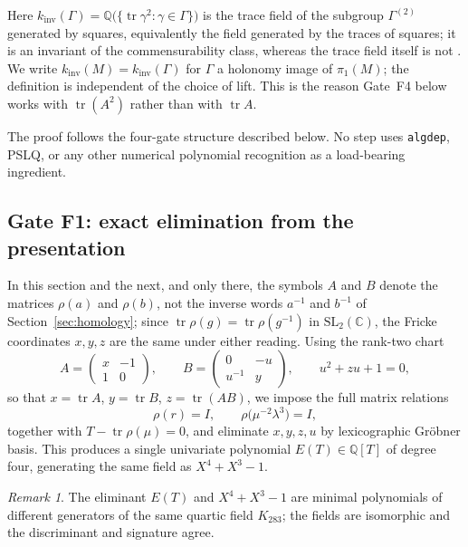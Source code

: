 \documentclass[11pt,a4paper]{article}
\theoremstyle{definition}
\theoremstyle{remark}
\newtheorem{remark}[theorem]{Remark}
\newcommand{\tr}{\operatorname{tr}}
\newcommand{\kinv}{k_{\mathrm{inv}}}
\newcommand{\SLtwo}{\mathrm{SL}_2(\mathbb{C})}
\newcommand{\Q}{\mathbb{Q}}
\begin{document}
Here $\kinv(\Gamma) = \Q\bigl(\{\tr\gamma^2 : \gamma \in \Gamma\}\bigr)$
is the trace field of the subgroup $\Gamma^{(2)}$ generated by squares,
equivalently the field generated by the traces of squares; it is an
invariant of the commensurability class, whereas the trace field itself
is not \cite[Ch.~3]{MR}. We write $\kinv(M) = \kinv(\Gamma)$ for
$\Gamma$ a holonomy image of $\pi_1(M)$; the definition is independent
of the choice of lift. This is the reason Gate~F4 below works with
$\tr(A^2)$ rather than with $\tr A$.

The proof follows the four-gate structure described below. No step
uses \texttt{algdep}, PSLQ, or any other numerical polynomial
recognition as a load-bearing ingredient.

\subsection{Gate F1: exact elimination from the presentation}

In this section and the next, and only there, the symbols $A$ and $B$
denote the matrices $\rho(a)$ and $\rho(b)$, not the inverse words
$a^{-1}$ and $b^{-1}$ of Section~\ref{sec:homology}; since
$\tr\rho(g) = \tr\rho(g^{-1})$ in $\SLtwo$, the Fricke coordinates
$x,y,z$ are the same under either reading. Using the rank-two chart
\begin{equation}
A = \begin{pmatrix} x & -1 \\ 1 & 0 \end{pmatrix},
\qquad
B = \begin{pmatrix} 0 & -u \\ u^{-1} & y \end{pmatrix},
\qquad u^2 + zu + 1 = 0,
\end{equation}
so that $x = \tr A$, $y = \tr B$, $z = \tr(AB)$, we impose the full
matrix relations
\begin{equation}
\rho(r) = I, \qquad \rho\bigl(\mu^{-2}\lambda^{3}\bigr) = I,
\end{equation}
together with $T - \tr\rho(\mu) = 0$, and eliminate
$x,y,z,u$ by lexicographic Gr\"obner basis. This produces a single
univariate polynomial $E(T) \in \Q[T]$ of degree four, generating
the same field as $X^4+X^3-1$.

\begin{remark}
The eliminant $E(T)$ and $X^4+X^3-1$ are minimal polynomials of
different generators of the same quartic field $K_{283}$; the fields
are isomorphic and the discriminant and signature agree.
\end{remark}
\end{document}
